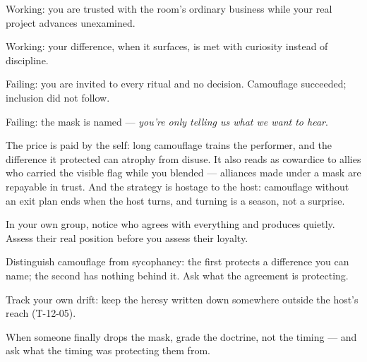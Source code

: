 \begin{feedback}
  \item Working: you are trusted with the room's ordinary business while your real project advances unexamined.
  \item Working: your difference, when it surfaces, is met with curiosity instead of discipline.
  \item Failing: you are invited to every ritual and no decision. Camouflage succeeded; inclusion did not follow.
  \item Failing: the mask is named --- \emph{you're only telling us what we want to hear}.
\end{feedback}
\begin{failure}
The price is paid by the self: long camouflage trains the performer, and the difference it protected can atrophy from disuse. It also reads as cowardice to allies who carried the visible flag while you blended --- alliances made under a mask are repayable in trust. And the strategy is hostage to the host: camouflage without an exit plan ends when the host turns, and turning is a season, not a surprise.
\end{failure}
\begin{countermeasures}
  \item In your own group, notice who agrees with everything and produces quietly. Assess their real position before you assess their loyalty.
  \item Distinguish camouflage from sycophancy: the first protects a difference you can name; the second has nothing behind it. Ask what the agreement is protecting.
  \item Track your own drift: keep the heresy written down somewhere outside the host's reach (T-12-05).
  \item When someone finally drops the mask, grade the doctrine, not the timing --- and ask what the timing was protecting them from.
\end{countermeasures}

\seesources
{}
